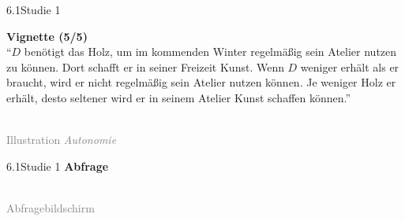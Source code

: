 \documentclass[xcolor=table,9pt,aspectratio=169]{beamer}
\begin{document}
\begin{frame}{\vspace*{10mm}6.1\hspace*{1em}Studie 1}
\begin{multicols}{2}
   \textbf{Vignette (5/5)}\\
   \medskip
   \enquote{$D$ benötigt das Holz, um im kommenden Winter regelmäßig sein Atelier nutzen zu können. Dort schafft er in seiner Freizeit Kunst. Wenn $D$ weniger erhält als er braucht, wird er nicht regelmäßig sein Atelier nutzen können. Je weniger Holz er erhält, desto seltener wird er in seinem Atelier Kunst schaffen können.}
   \vfill
   \begin{center}
      \\
      \textcolor{gray}{Illustration \textit{Autonomie}}
   \end{center}
\end{multicols}
\end{frame}


\begin{frame}{\vspace*{10mm}6.1\hspace*{1em}Studie 1}
\textbf{Abfrage}\\
\medskip
\begin{center}
   \\
   \textcolor{gray}{Abfragebildschirm}
\end{center}
\end{frame}
\end{document}
